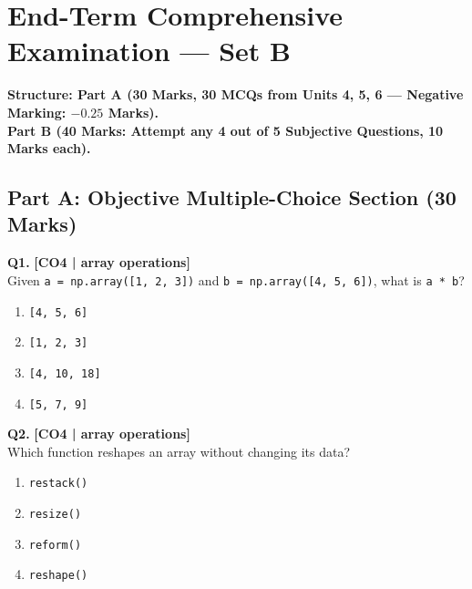 \section{End-Term Comprehensive Examination --- Set B}


\begin{center}
\sffamily\textbf{\color{AlertRed}Structure: Part A (30 Marks, 30 MCQs from Units 4, 5, 6 --- Negative Marking: $-0.25$ Marks).}\\
\textbf{\color{AlertRed}Part B (40 Marks: Attempt any 4 out of 5 Subjective Questions, 10 Marks each).}
\end{center}
\vspace{{2mm}}

\subsection*{Part A: Objective Multiple-Choice Section (30 Marks)}

\noindent\textbf{Q1.} \hfill {\small\color{LPUOrange}\textbf{[CO4 | array operations]}}\\[2pt]
Given \texttt{a = np.array([1, 2, 3])} and \texttt{b = np.array([4, 5, 6])}, what is \texttt{a * b}?

\begin{enumerate}[label=(\alph*),topsep=2pt,itemsep=1pt,partopsep=0pt,parsep=0pt]
    \item \relax \texttt{[4, 5, 6]}
    \item \relax \texttt{[1, 2, 3]}
    \item \relax \texttt{[4, 10, 18]}
    \item \relax \texttt{[5, 7, 9]}
\end{enumerate}
\vspace{{2mm}}

\noindent\textbf{Q2.} \hfill {\small\color{LPUOrange}\textbf{[CO4 | array operations]}}\\[2pt]
Which function reshapes an array without changing its data?

\begin{enumerate}[label=(\alph*),topsep=2pt,itemsep=1pt,partopsep=0pt,parsep=0pt]
    \item \relax \texttt{restack()}
    \item \relax \texttt{resize()}
    \item \relax \texttt{reform()}
    \item \relax \texttt{reshape()}
\end{enumerate}
\vspace{{2mm}}

